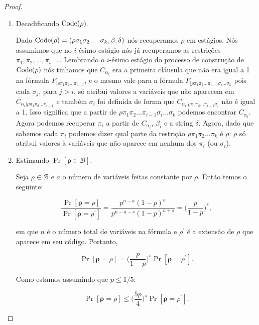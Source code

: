 \begin{proof}
\begin{enumerate}
	\item Decodificando $\text{Code}(\rho)$.
	
	Dado $\text{Code}(\rho) = (\rho\sigma_{1}\sigma_{2}\dots\sigma_{k}, \beta, \delta)$ nós recuperamos $\rho$ em estágios. Nós assumimos que no $i$-ésimo estágio nós já recuperamos as restrições $\pi_{1}, \pi_{2}, \dots, \pi_{i - 1}$. Lembrando o $i$-ésimo estágio do processo de construção de $\text{Code}(\rho)$ nós tinhamos que $C_{\alpha_{i}}$ era a primeira cláusula que não era igual a 1 na fórmula $F_{\lvert \rho\pi_{1}\pi_{2}\dots\pi_{i - 1}}$, e o mesmo vale para a fórmula $F_{\lvert \rho\pi_{1}\pi_{2}\dots\pi_{i - 1}\sigma_{i}\dots\sigma_{k}}$ pois cada $\sigma_{j}$, para $j > i$, só atribui valores a variáveis que não aparecem em $C_{\alpha_{i} \lvert \rho \pi_{1}\pi_{2}\dots\pi_{i - 1}}$ e também $\sigma_{i}$ foi definida de forma que $C_{\alpha_{i} \lvert \rho\pi_{1}\pi_{2}\dots\pi_{i - 1}\sigma_{i}}$ não é igual a 1. Isso significa que a partir de $\rho\pi_{1}\pi_{2}\dots\pi_{i - 1}\sigma_{i}\dots\sigma_{k}$ podemos encontrar $C_{\alpha_{i}}$. Agora podemos recuperar $\pi_{i}$ a partir de $C_{\alpha_{i}}$,  $\beta_{i}$ e a string $\delta$. Agora, dado que sabemos cada $\pi_{i}$ podemos dizer qual parte da restrição $\rho\pi_{1}\pi_{2}\dots\pi_{k}$ é $\rho$: $\rho$ só atribui valores à variáveis que não aparece em nenhum dos $\pi_{i}$ (ou $\sigma_{i}$).
	
	\item Estimando $\Pr[\boldsymbol{\rho} \in \mathcal{B}]$.
	
	Seja $\rho \in \mathcal{B}$ e $a$ o número de variáveis feitas constante por $\rho$. Então temos o seguinte:
	
	\begin{equation*}
	    \frac{\Pr[\boldsymbol{\rho} = \rho]}{\Pr[\boldsymbol{\rho} = \rho^{\prime}]} = \frac{p^{n - a}(1 - p)^{a}}{p^{n - a- s}(1 - p)^{a + s}} = \bigg( \frac{p}{1 - p} \bigg)^{s},
	\end{equation*}
	
	em que $n$ é o número total de variáveis na fórmula e $\rho^{\prime}$ é a extensão de $\rho$ que aparece em seu código. Portanto,
	
	\begin{equation*}
	    \Pr[\boldsymbol{\rho} = \rho] = \bigg(\frac{p}{1 - p} \bigg)^{s} \Pr[\boldsymbol{\rho} = \rho^{\prime}].
	\end{equation*}
	
	Como estamos assumindo que $p \leq 1/5$:
	
	\begin{equation*}
	    \Pr[\boldsymbol{\rho} = \rho] \leq \Big( \frac{5p}{4} \Big)^{s} \Pr[\boldsymbol{\rho} = \rho^{\prime}].
	\end{equation*}
	

\end{enumerate}
\end{proof}
